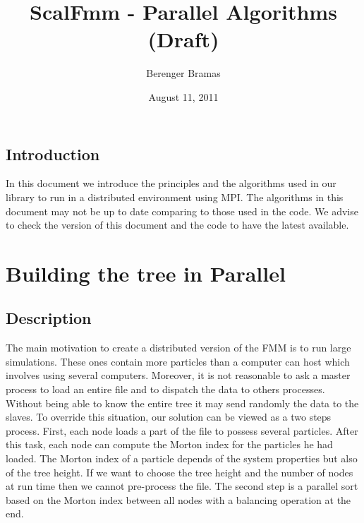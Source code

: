 \documentclass[12pt,letterpaper,titlepage]{report}
\author{Berenger Bramas}
\title{ScalFmm - Parallel Algorithms (Draft)}
\date{August 11, 2011}
\begin{document}
\maketitle{}
\newpage
\tableofcontents
\newpage
\section{Introduction}
In this document we introduce the principles and the algorithms used in our library to run in a distributed environment using MPI.
The algorithms in this document may not be up to date comparing to those used in the code.
We advise to check the version of this document and the code to have the latest available.
\chapter{Building the tree in Parallel}
\section{Description}
The main motivation to create a distributed version of the FMM is to run large simulations.
These ones contain more particles than a computer can host which involves using several computers.
Moreover, it is not reasonable to ask a master process to load an entire file and to dispatch the data to others processes. Without being able to know the entire tree it may send randomly the data to the slaves.
To override this situation, our solution can be viewed as a two steps process.
First, each node loads a part of the file to possess several particles.
After this task, each node can compute the Morton index for the particles he had loaded.
The Morton index of a particle depends of the system properties but also of the tree height.
If we want to choose the tree height and the number of nodes at run time then we cannot pre-process the file.
The second step is a parallel sort based on the Morton index between all nodes with a balancing operation at the end.
\end{document}
